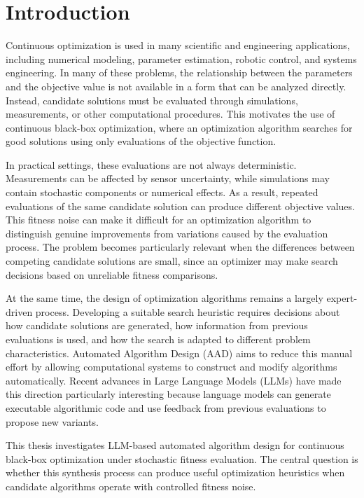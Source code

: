 
\chapter{Introduction}\label{chap:intro}

Continuous optimization is used in many scientific and engineering applications,
including numerical modeling, parameter estimation, robotic control, and systems
engineering. In many of these problems, the relationship between the parameters
and the objective value is not available in a form that can be analyzed
directly. Instead, candidate solutions must be evaluated through simulations,
measurements, or other computational procedures. This motivates the use of
continuous black-box optimization, where an optimization algorithm searches for
good solutions using only evaluations of the objective function.

In practical settings, these evaluations are not always deterministic.
Measurements can be affected by sensor uncertainty, while simulations may
contain stochastic components or numerical effects. As a result, repeated
evaluations of the same candidate solution can produce different objective
values. This fitness noise can make it difficult for an optimization algorithm
to distinguish genuine improvements from variations caused by the evaluation
process. The problem becomes particularly relevant when the differences between
competing candidate solutions are small, since an optimizer may make search
decisions based on unreliable fitness comparisons.

At the same time, the design of optimization algorithms remains a largely
expert-driven process. Developing a suitable search heuristic requires decisions
about how candidate solutions are generated, how information from previous
evaluations is used, and how the search is adapted to different problem
characteristics. Automated Algorithm Design (AAD) aims to reduce this manual
effort by allowing computational systems to construct and modify algorithms
automatically. Recent advances in Large Language Models (LLMs) have made this
direction particularly interesting because language models can generate
executable algorithmic code and use feedback from previous evaluations to
propose new variants.

This thesis investigates LLM-based automated algorithm design for continuous
black-box optimization under stochastic fitness evaluation. The central question
is whether this synthesis process can produce useful optimization heuristics
when candidate algorithms operate with controlled fitness noise.

